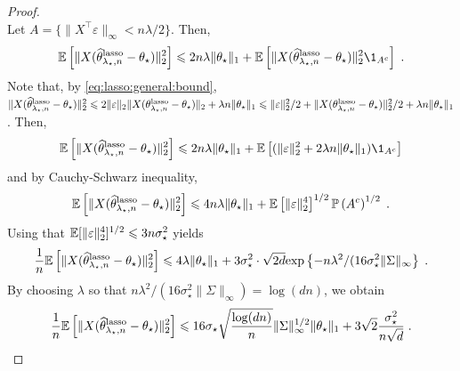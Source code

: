 \begin{proof}
$$$$
Let $A = \{\|X^\top\varepsilon\|_\infty < n\lambda / 2\}$. Then,
\begin{align*}
\bE\left[\|X(\widehat\param^{\mathrm{lasso}}_{\lambda_\star,n}-\param_\star)\|_2^2\right] \leqslant 2 n \lambda \|\param_\star\|_1 + \bE\left[\|X(\widehat\param^{\mathrm{lasso}}_{\lambda_\star,n}-\param_\star)\|_2^2 \1_{A^c}\right]\eqsp.
\end{align*}
Note that, by \eqref{eq:lasso:general:bound}, $\|X(\widehat{\theta}^{\mathrm{lasso}}_{\lambda_\star,n}-\theta_\star)\|_2^2 \leqslant 2 \|\varepsilon \|_2 \|X(\theta^{\mathrm{lasso}}_{\lambda_\star,n}-\theta_\star)\|_2 + \lambda n \|\theta_\star\|_1 \leqslant  \|\varepsilon \|_2^2/2 +  \|X(\theta^{\mathrm{lasso}}_{\lambda_\star,n}-\theta_\star)\|_2^2/2 + \lambda n \|\theta_\star\|_1$. Then,
$$
\bE\left[\|X(\widehat\param^{\mathrm{lasso}}_{\lambda_\star,n}-\param_\star)\|_2^2\right] \leqslant 2 n \lambda \|\param_\star\|_1 + \bE\left[ (\|\varepsilon \|_2^2 + 2\lambda n \|\param_\star\|_1) \1_{A^c}\right]
$$
and by Cauchy-Schwarz inequality,
$$
\mathbb{E}\left[\|X(\widehat{\theta}^{\mathrm{lasso}}_{\lambda_\star,n}-\theta_\star)\|_2^2\right] \leqslant 4 n \lambda \|\theta_\star\|_1 + \mathbb{E}\left[\|\varepsilon \|_2^4\right]^{1/2} \mathbb{P}\left(A^c\right)^{1/2}\;.
$$
Using that $\mathbb{E}[\|\varepsilon \|_2^4]^{1/2}\leqslant 3n\sigma_\star^2$ yields
$$
\frac{1}{n}\mathbb{E}\left[\|X(\widehat{\theta}^{\mathrm{lasso}}_{\lambda_\star,n}-\theta_\star)\|_2^2\right] \leqslant  4\lambda \|\theta_\star\|_1  + 3\sigma_\star^2 \cdot \sqrt{2 d}\mathrm{exp}\left\{-n\lambda^2/(16\sigma_\star^2  \|\Sigma\|_\infty\right\}\;.
$$
By choosing $\lambda$ so that $n\lambda^2/(16\sigma_\star^2  \|\Sigma\|_\infty) = \log(dn)$, we obtain
$$
\frac{1}{n}\mathbb{E}\left[\|X(\widehat{\theta}^{\mathrm{lasso}}_{\lambda_\star,n}-\theta_\star)\|_2^2\right] \leqslant  16\sigma_\star\sqrt{\frac{\log(dn)}{n}}\|\Sigma\|_\infty^{1/2}\|\theta_\star\|_1  + 3\sqrt{2}\frac{\sigma_\star^2}{n\sqrt{d}} \;.
$$
\end{proof}
